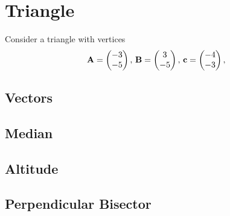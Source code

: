 \documentclass[11pt]{book}
\begin{document}
\frontmatter
\tableofcontents
\setcounter{page}{1}
\mainmatter
\chapter{Triangle}
Consider a triangle with vertices
\begin{align}
\label{eq:tri-pts}
\vec{A}=\myvec{-3 \\ -5},\,
\vec{B}=\myvec{3\\-5},\,
	\vec{c}=\myvec{-4\\-3},\,
\end{align}

\section{Vectors}
\section{Median}
\section{Altitude}
\section{Perpendicular Bisector}
\end{document}
